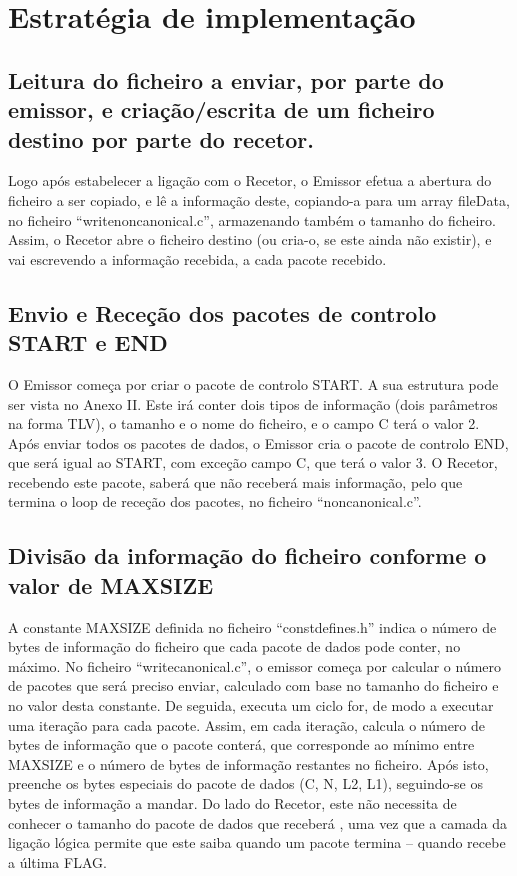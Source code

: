 \documentclass[article, a4paper, 11pt, oneside]{memoir}
\begin{document}
\section{Estratégia de implementação}
\subsection{Leitura do ficheiro a enviar, por parte do emissor, e criação/escrita de um ficheiro destino por parte do recetor.} 

Logo após estabelecer a ligação com o Recetor, o Emissor efetua a abertura do ficheiro a ser copiado, e lê a informação deste,
copiando-a para um array fileData, no ficheiro “writenoncanonical.c”, armazenando também o 
tamanho do ficheiro. Assim, o Recetor abre o ficheiro destino (ou cria-o, se este ainda não existir), e vai escrevendo a informação recebida, a cada pacote recebido.

\subsection{Envio e Receção dos pacotes de controlo START e END}
O Emissor começa por criar o pacote de controlo START. A sua estrutura pode ser vista no Anexo II. Este irá conter dois tipos de informação (dois parâmetros na forma TLV), 
o tamanho e o nome do ficheiro,
 e o campo C terá o valor 2. 
Após enviar todos os pacotes de dados, o Emissor cria o pacote de controlo END, que será igual ao START, com exceção 
 campo C, que terá o valor 3. 
O Recetor, recebendo este pacote, saberá que não receberá mais informação, pelo que termina o loop de receção dos
 pacotes, no ficheiro “noncanonical.c”.

\subsection{Divisão da informação do ficheiro conforme o valor de MAX\textunderscore SIZE}

A constante MAX\textunderscore SIZE definida no ficheiro “const\textunderscore defines.h” indica o número de bytes de informação do
ficheiro que cada pacote de dados pode conter, no máximo.
No ficheiro “writecanonical.c”, o emissor começa por calcular o número de pacotes que será preciso enviar, 
calculado com base no tamanho do ficheiro e no valor desta constante. De seguida, executa um ciclo for, de modo 
a executar uma iteração para cada pacote.
Assim, em cada iteração, calcula o número de bytes de informação que o pacote conterá, que corresponde ao 
mínimo entre MAX\textunderscore SIZE e o número de bytes de informação 
restantes no ficheiro. Após isto, preenche os bytes especiais do pacote de dados (C, N, L2, L1), seguindo-se 
os bytes de informação a mandar. Do lado do Recetor, 
este não necessita de conhecer o tamanho do pacote de dados que receberá , uma vez que a camada da ligação 
lógica permite que este saiba quando um pacote termina – quando recebe a última FLAG.
\end{document}
